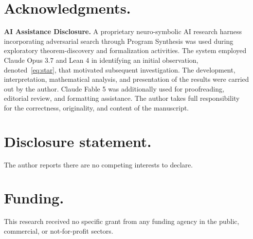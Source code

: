 \documentclass{article}
\theoremstyle{plain}
\theoremstyle{definition}
\begin{document}
\section*{Acknowledgments.}

\textbf{AI Assistance Disclosure.} A proprietary neuro-symbolic AI research
harness incorporating adversarial search through Program Synthesis was used during
exploratory theorem-discovery and formalization activities. The system employed
Claude Opus 3.7 and Lean 4 in identifying an initial observation, denoted~\eqref{eq:star}, that
motivated subsequent investigation. The development, interpretation,
mathematical analysis, and presentation of the results were carried out by the
author. Claude Fable 5 was additionally used for proofreading, editorial
review, and formatting assistance. The author takes full responsibility for the
correctness, originality, and content of the manuscript.

\section*{Disclosure statement.}

The author reports there are no competing interests to declare.

\section*{Funding.}

This research received no specific grant from any funding agency in the
public, commercial, or not-for-profit sectors.
\end{document}
